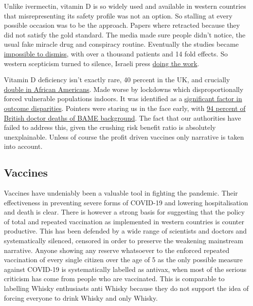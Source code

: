 \documentclass[11pt,a4paper]{article}
\begin{document}
Unlike ivermectin, vitamin D is so widely used and available in western countries that misrepresenting its safety profile was not an option. So stalling at every possible occasion was to be the approach. Papers where retracted because they did not satisfy the gold standard. The media made sure people didn't notice, the usual fake miracle drug and conspiracy routine. Eventually the studies became \href{https://journals.plos.org/plosone/article?id=10.1371/journal.pone.0263069}{impossible to dismiss}, with over a thousand patients and 14 fold effects. So western scepticism turned to silence, Israeli press \href{https://www.timesofisrael.com/israeli-study-offers-strongest-proof-yet-of-vitamin-ds-power-to-fight-covid/}{doing the work}. 

Vitamin D deficiency isn't exactly rare, 40 percent in the UK, and crucially \href{https://www.cooperinstitute.org/2019/09/24/african-americans-at-greatest-risk-of-vitamin-d-deficiency}{double in African Americans}. Made worse by lockdowns which disproportionally forced vulnerable populations indoors. It was identified as a \href{https://pubmed.ncbi.nlm.nih.gov/33546262/}{significant factor in outcome disparities}. Pointers were staring us in the face early, with \href{https://twitter.com/TheBMA/status/1271768163630428160?s=20}{94 percent of British doctor deaths of BAME background}. The fact that our authorities have failed to address this, given the crushing risk benefit ratio is absolutely unexplainable. Unless of course the profit driven vaccines only narrative is taken into account. 

\subsection*{Vaccines}

Vaccines have undeniably been a valuable tool in fighting the pandemic. Their effectiveness in preventing severe forms of COVID-19 and lowering hospitalisation and death is clear. There is however a strong basis for suggesting that the policy of total and repeated vaccination as implemented in western countries is counter productive. This has been defended by a wide range of scientists and doctors and systematically silenced, censored in order to preserve the weakening mainstream narrative. Anyone showing any reserve whatsoever to the enforced repeated vaccination of every single citizen over the age of 5 as the only possible measure against COVID-19 is systematically labelled as antivax, when most of the serious criticism has come from people who are vaccinated. This is comparable to labelling Whisky enthusiasts anti Whisky because they do not support the idea of forcing everyone to drink Whisky and only Whisky.
\end{document}
